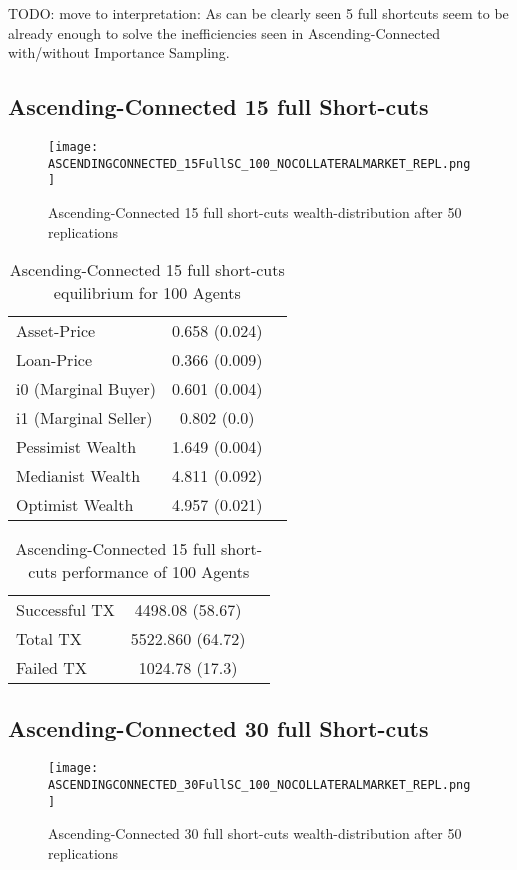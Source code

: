 \documentclass[Bachelorarbeit.tex]{subfiles}
\begin{document}
TODO: move to interpretation: As can be clearly seen 5 full shortcuts seem to be already enough to solve the inefficiencies seen in Ascending-Connected with/without Importance Sampling.

\subsection{Ascending-Connected 15 full Short-cuts }
\begin{figure}[!htbp]
	\centering
  \texttt{[image: ASCENDINGCONNECTED\_15FullSC\_100\_NOCOLLATERALMARKET\_REPL.png]}
	\caption{Ascending-Connected 15 full short-cuts wealth-distribution after 50 replications}
	\label{fig1}
\end{figure}

\begin{table}[h]
	\caption{Ascending-Connected 15 full short-cuts equilibrium for 100 Agents}
	\centering
	\begin{tabular} { l c r }
		\hline
		Asset-Price & 0.658 (0.024) \\
		Loan-Price & 0.366 (0.009) \\
		i0 (Marginal Buyer) & 0.601 (0.004) \\
		i1 (Marginal Seller) & 0.802 (0.0) \\
		Pessimist Wealth & 1.649 (0.004) \\
		Medianist Wealth & 4.811 (0.092) \\
		Optimist Wealth & 4.957 (0.021) \\
		\hline
	\end{tabular}
\end{table} 

\begin{table}[!htbp]
	\caption{Ascending-Connected 15 full short-cuts performance of 100 Agents}
	\centering
	\begin{tabular} { l c r }
		\hline
		Successful TX & 4498.08 (58.67) \\
		Total TX & 5522.860 (64.72) \\
		Failed TX & 1024.78 (17.3) \\
		\hline
	\end{tabular}
\end{table}

\subsection{Ascending-Connected 30 full Short-cuts }
\begin{figure}[!htbp]
	\centering
  \texttt{[image: ASCENDINGCONNECTED\_30FullSC\_100\_NOCOLLATERALMARKET\_REPL.png]}
	\caption{Ascending-Connected 30 full short-cuts wealth-distribution after 50 replications}
	\label{fig1}
\end{figure}
\end{document}
